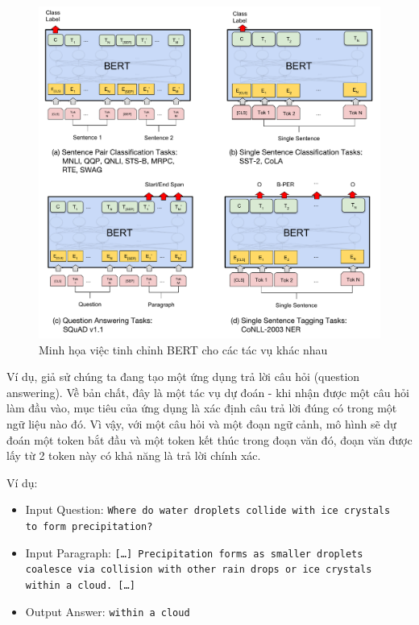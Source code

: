 \begin{figure}[htb]
    \centering
    \includegraphics[width=\textwidth]{image/BERT_fine_tune.pdf}
    \caption{Minh họa việc tinh chỉnh BERT cho các tác vụ khác nhau \cite{bert}}
    \label{figure:BERT_fine_tuning}
\end{figure}

Ví dụ, giả sử chúng ta đang tạo một ứng dụng trả lời câu hỏi (question answering). Về bản chất, đây là một tác vụ dự đoán - khi nhận được một câu hỏi làm đầu vào, mục tiêu của ứng dụng là xác định câu trả lời đúng có trong một ngữ liệu nào đó. Vì vậy, với một câu hỏi và một đoạn ngữ cảnh, mô hình sẽ dự đoán một token bắt đầu và một token kết thúc trong đoạn văn đó, đoạn văn được lấy từ 2 token này có khả năng là trả lời chính xác.

Ví dụ:

\begin{itemize}
    \item Input Question:
          \texttt{Where do water droplets collide with ice crystals\\ to form precipitation?}

    \item Input Paragraph:
          \texttt{[\dots] Precipitation forms as smaller droplets\\ coalesce via collision with other rain drops or ice crystals\\ within a cloud. [\dots]}

    \item Output Answer:
          \texttt{within a cloud}
\end{itemize}

